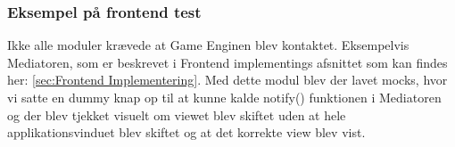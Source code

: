 \subsubsection{Eksempel på frontend test}
Ikke alle moduler krævede at Game Enginen blev kontaktet. Eksempelvis Mediatoren, som er beskrevet i Frontend implementings afsnittet som kan findes her: \autoref{sec:Frontend Implementering}. Med dette modul blev der lavet mocks, hvor vi satte en dummy knap op til at kunne kalde notify() funktionen i Mediatoren og der blev tjekket visuelt om viewet blev skiftet uden at hele applikationsvinduet blev skiftet og at det korrekte view blev vist. 